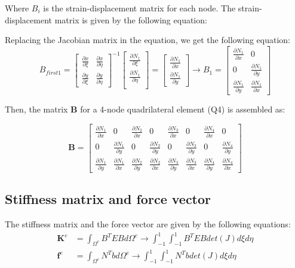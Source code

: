 \documentclass{article}  %
\begin{document}
Where \( B_i \) is the strain-displacement matrix for each node. The strain-displacement matrix is given by the following equation:


Replacing the Jacobian matrix in the equation, we get the following equation:
\begin{equation}
  B_{first1} =  \begin{bmatrix}
    \frac{\partial x}{\partial \xi} & \frac{\partial x}{\partial \eta} \\
    \frac{\partial y}{\partial \xi} & \frac{\partial y}{\partial \eta}
    \end{bmatrix}^{-1} 
  \begin{bmatrix}
    \frac{\partial N_1}{\partial \xi} \\
    \frac{\partial N_1}{\partial \eta} \\
  \end{bmatrix}
  =
  \begin{bmatrix}
    \frac{\partial N_1}{\partial x} \\
    \frac{\partial N_1}{\partial y} 
  \end{bmatrix}
  \rightarrow
  B_1= \begin{bmatrix}
    \frac{\partial N_1}{\partial x} & 0 \\
    0 & \frac{\partial N_1}{\partial y} \\
    \frac{\partial N_1}{\partial y} & \frac{\partial N_1}{\partial x}
  \end{bmatrix}
\end{equation}

Then, the matrix \( \boldsymbol{B} \) for a 4-node quadrilateral element (Q4) is assembled as:

\[
\boldsymbol{B} =
\begin{bmatrix}
\frac{\partial N_1}{\partial x} & 0 & \frac{\partial N_2}{\partial x} & 0 & \frac{\partial N_3}{\partial x} & 0 & \frac{\partial N_4}{\partial x} & 0 \\
0 & \frac{\partial N_1}{\partial y} & 0 & \frac{\partial N_2}{\partial y} & 0 & \frac{\partial N_3}{\partial y} & 0 & \frac{\partial N_4}{\partial y} \\
\frac{\partial N_1}{\partial y} & \frac{\partial N_1}{\partial x} & \frac{\partial N_2}{\partial y} & \frac{\partial N_2}{\partial x} & \frac{\partial N_3}{\partial y} & \frac{\partial N_3}{\partial x} & \frac{\partial N_4}{\partial y} & \frac{\partial N_4}{\partial x}
\end{bmatrix}
\]

\subsection{Stiffness matrix and force vector}
The stiffness matrix and the force vector are given by the following equations:
\begin{align}
  \mathbf{K}^e &= \int_{\Omega^e} B^T E B d\Omega^e \rightarrow \int_{-1}^{1}\int_{-1}^{1} B^T E B det(J)d\xi d\eta\\
  \mathbf{f}^e &= \int_{\Omega^e} N^T b d\Omega^e \rightarrow \int_{-1}^{1}\int_{-1}^{1} N^T b det(J)d\xi d\eta\\
\end{align}
\end{document}
